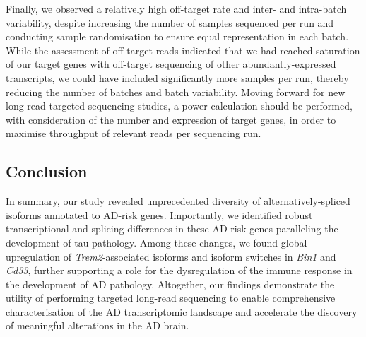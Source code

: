 Finally, we observed a relatively high off-target rate and inter- and intra-batch variability, despite increasing the number of samples sequenced per run and conducting sample randomisation to ensure equal representation in each batch. While the assessment of off-target reads indicated that we had reached saturation of our target genes with off-target sequencing of other abundantly-expressed transcripts, we could have included significantly more samples per run, thereby reducing the number of batches and batch variability. Moving forward for new long-read targeted sequencing studies, a power calculation should be performed, with consideration of the number and expression of target genes, in order to maximise throughput of relevant reads per sequencing run.      
    
\subsection{Conclusion}
In summary, our study revealed unprecedented diversity of alternatively-spliced isoforms annotated to AD-risk genes. Importantly, we identified robust transcriptional and splicing differences in these AD-risk genes paralleling the development of tau pathology. Among these changes, we found global upregulation of \textit{Trem2}-associated isoforms and isoform switches in \textit{Bin1} and \textit{Cd33}, further supporting a role for the dysregulation of the immune response in the development of AD pathology. Altogether, our findings demonstrate the utility of performing targeted long-read sequencing to enable comprehensive characterisation of the AD transcriptomic landscape and accelerate the discovery of meaningful alterations in the AD brain.  


